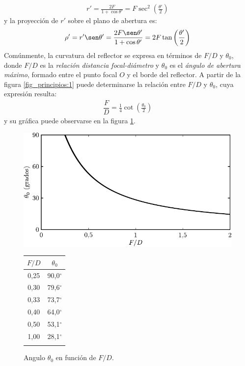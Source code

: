 \begin{align}
r' = \frac{2F}{1 + \cos\theta '} = F\sec^2\left(\frac{\theta '}{2}\right)
\label{ec_principios:2}
\end{align}
y la proyección de $r'$ sobre el plano de abertura es:
\begin{align}
\rho ' = r'\sen\theta ' = \frac{2F\sen\theta '}{1 + \cos\theta '} = 2F\tan\left(\frac{\theta '}{2}\right)
\label{ec_principios:3}
\end{align}
Comúnmente, la curvatura del reflector se expresa en términos de $F/D$ y $\theta_0$, donde $F/D$ es la \emph{relación distancia focal-diámetro} y $\theta_0$ es el \emph{ángulo de abertura máximo}, formado entre el punto focal $O$ y el borde del reflector. A partir de la figura \ref{fig_principios:1} puede determinarse la relación entre $F/D$ y $\theta_0$, cuya expresión resulta:
\begin{align}
\dfrac{F}{D} = \frac{1}{4}\cot\left(\frac{\theta_0}{2}\right)
\label{ec_principios:4}
\end{align}
y su gráfica puede observarse en la figura \ref{fig_principios:2}.
\begin{figure}[H]
\begin{minipage}{.5\textwidth}
\includegraphics[scale = 1]{Figures/Principios/principios_2}
\end{minipage}
\begin{minipage}{.5\textwidth}
\hfill
\begin{tabular}{cc}
$F/D$ & $\theta_0$ \\
\hline
0,25 & 90,0$^{\circ}$\\
0,30 & 79,6$^{\circ}$\\
0,33 & 73,7$^{\circ}$\\
0,40 & 64,0$^{\circ}$\\
0,50 & 53,1$^{\circ}$\\
1,00 & 28,1$^{\circ}$\\
\\
\end{tabular}
\end{minipage}
\caption{Angulo $\theta_0$ en función de $F/D$.}
\label{fig_principios:2}
\end{figure}
